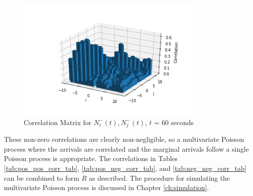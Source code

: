 \begin{figure}[t]
\begin{center}
\caption{Correlation Matrix for $N^{-}_i(t), N^{-}_j(t)$, $t$ = 60 seconds}
\label{fig:neg_neg_corr_pic}
\includegraphics[width=0.8\textwidth]{LaTeX/Figures/neg_neg_correlations.png}
\end{center}
\end{figure}

These non-zero correlations are clearly non-negligible, so a multivariate Poisson process where the arrivals are correlated and the marginal arrivals follow a single Poisson process is appropriate. The correlations in Tables \ref{tab:pos_pos_corr_tab}, \ref{tab:pos_neg_corr_tab}, and \ref{tab:neg_neg_corr_tab} can be combined to form $R$ as described. The procedure for simulating the multivariate Poisson process is discussed in Chapter \ref{ch:simulation}.
